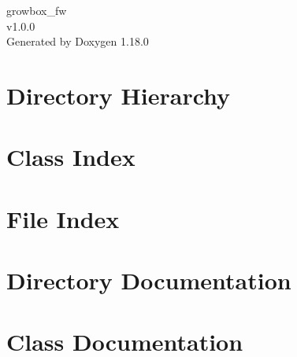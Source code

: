 \documentclass[twoside]{book}
\newcommand{\+}{\discretionary{\mbox{\scriptsize$\hookleftarrow$}}{}{}}
\newcommand{\clearemptydoublepage}{%
    \newpage{\pagestyle{empty}\cleardoublepage}%
  }
\begin{document}
  \raggedbottom
    \hypersetup{pageanchor=false,
                bookmarksnumbered=true,
                pdfencoding=unicode
               }
  \begin{titlepage}
  \vspace*{7cm}
  \begin{center}%
  {\Large growbox\+\_\+fw}\\
  [1ex]\large v1.\+0.\+0 \\
  \vspace*{1cm}
  {\large Generated by Doxygen 1.18.0}\\
  \end{center}
  \end{titlepage}
  \clearemptydoublepage
  \tableofcontents
  \clearemptydoublepage
  \hypersetup{pageanchor=true}




\chapter{Directory Hierarchy}

\chapter{Class Index}

\chapter{File Index}

\chapter{Directory Documentation}








\chapter{Class Documentation}



















\end{document}
